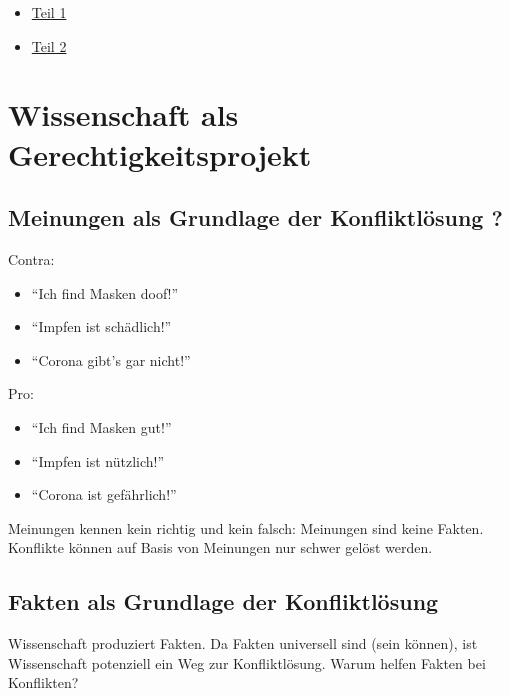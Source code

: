 \documentclass[
  a4paper,
  DIV=11]{scrreprt}
\providecommand{\tightlist}{%
  \setlength{\itemsep}{0pt}\setlength{\parskip}{0pt}}\usepackage{longtable,booktabs,array}
\theoremstyle{definition}
\theoremstyle{remark}
\begin{document}
\begin{itemize}
\tightlist
\item
  \href{https://youtu.be/WQOmGUyMkxU}{Teil 1}
\item
  \href{https://youtu.be/k-CB0VGRENY}{Teil 2}
\end{itemize}

\hypertarget{wissenschaft-als-gerechtigkeitsprojekt}{%
\section{Wissenschaft als
Gerechtigkeitsprojekt}\label{wissenschaft-als-gerechtigkeitsprojekt}}

\hypertarget{meinungen-als-grundlage-der-konfliktluxf6sung}{%
\subsection{Meinungen als Grundlage der Konfliktlösung
?}\label{meinungen-als-grundlage-der-konfliktluxf6sung}}

Contra:

\begin{itemize}
\tightlist
\item
  ``Ich find Masken doof!''
\item
  ``Impfen ist schädlich!''
\item
  ``Corona gibt's gar nicht!''
\end{itemize}

Pro:

\begin{itemize}
\tightlist
\item
  ``Ich find Masken gut!''
\item
  ``Impfen ist nützlich!''
\item
  ``Corona ist gefährlich!''
\end{itemize}

Meinungen kennen kein richtig und kein falsch: Meinungen sind keine
Fakten. Konflikte können auf Basis von Meinungen nur schwer gelöst
werden.

\hypertarget{fakten-als-grundlage-der-konfliktluxf6sung}{%
\subsection{Fakten als Grundlage der
Konfliktlösung}\label{fakten-als-grundlage-der-konfliktluxf6sung}}

Wissenschaft produziert Fakten. Da Fakten universell sind (sein können),
ist Wissenschaft potenziell ein Weg zur Konfliktlösung. Warum helfen
Fakten bei Konflikten?
\end{document}
